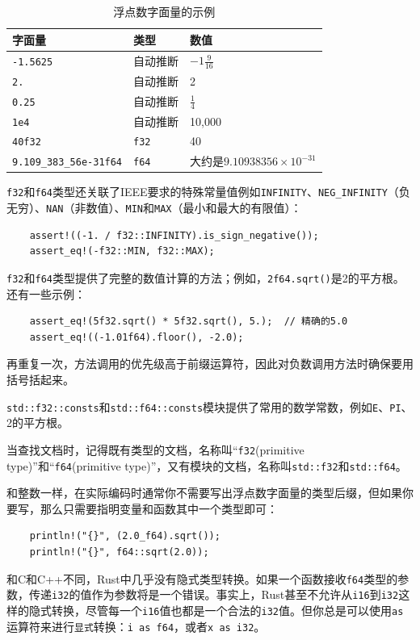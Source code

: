 \begin{table}[htbp]
    \centering
    \caption{浮点数字面量的示例}
    \label{t3-9}
    \begin{tabular}{lll}
        \hline
        \textbf{字面量} & \textbf{类型} & \textbf{数值} \\
        \hline
        \texttt{-1.5625}    & 自动推断  & $-1\frac{9}{16}$  \\
        \rowcolor{tablecolor}
        \texttt{2.}         & 自动推断  & 2 \\
        \texttt{0.25}       & 自动推断  & $\frac{1}{4}$   \\
        \rowcolor{tablecolor}
        \texttt{1e4}        & 自动推断  & 10,000    \\
        \texttt{40f32}      & \texttt{f32}  & 40    \\
        \rowcolor{tablecolor}
        \texttt{9.109\_383\_56e-31f64} & \texttt{f64} & 大约是$9.10938356\times10^{-31}$ \\
    \end{tabular}
\end{table}

\texttt{f32}和\texttt{f64}类型还关联了IEEE要求的特殊常量值例如\texttt{INFINITY}、\texttt{NEG\_INFINITY}（负无穷）、\texttt{NAN}（非数值）、\texttt{MIN}和\texttt{MAX}（最小和最大的有限值）：
\begin{verbatim}
    assert!((-1. / f32::INFINITY).is_sign_negative());
    assert_eq!(-f32::MIN, f32::MAX);
\end{verbatim}
\texttt{f32}和\texttt{f64}类型提供了完整的数值计算的方法；例如，\texttt{2f64.sqrt()}是2的平方根。还有一些示例：
\begin{verbatim}
    assert_eq!(5f32.sqrt() * 5f32.sqrt(), 5.);  // 精确的5.0
    assert_eq!((-1.01f64).floor(), -2.0);
\end{verbatim}

再重复一次，方法调用的优先级高于前缀运算符，因此对负数调用方法时确保要用括号括起来。

\texttt{std::f32::consts}和\texttt{std::f64::consts}模块提供了常用的数学常数，例如\texttt{E}、\texttt{PI}、2的平方根。

当查找文档时，记得既有类型的文档，名称叫“\texttt{f32}(primitive type)”和“\texttt{f64}(primitive type)”，又有模块的文档，名称叫\texttt{std::f32}和\texttt{std::f64}。

和整数一样，在实际编码时通常你不需要写出浮点数字面量的类型后缀，但如果你要写，那么只需要指明变量和函数其中一个类型即可：
\begin{verbatim}
    println!("{}", (2.0_f64).sqrt());
    println!("{}", f64::sqrt(2.0));
\end{verbatim}
和C和C++不同，Rust中几乎没有隐式类型转换。如果一个函数接收\texttt{f64}类型的参数，传递\texttt{i32}的值作为参数将是一个错误。事实上，Rust甚至不允许从\texttt{i16}到\texttt{i32}这样的隐式转换，尽管每一个\texttt{i16}值也都是一个合法的\texttt{i32}值。但你总是可以使用\texttt{as}运算符来进行\texttt{显式}转换：\texttt{i as f64}，或者\texttt{x as i32}。

